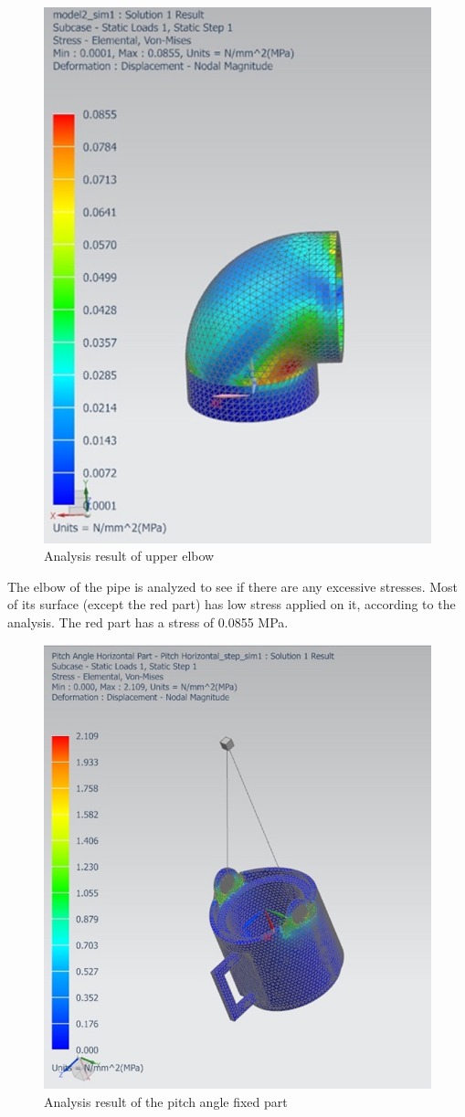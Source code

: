 \documentclass[12pt]{article}
\begin{document}
\begin{figure}[h!]
    \centering
    \includegraphics[width=0.5\linewidth]{elbowfinal.png}
    \caption{Analysis result of upper elbow}
    \label{fig:upperelbowfinal}
\end{figure}


The elbow of the pipe is analyzed to see if there are any excessive stresses. Most of its surface (except the red part) has low stress applied on it, according to the analysis. The red part has a stress of 0.0855 MPa.
\newpage

\begin{figure}[H]
    \centering
    \includegraphics[width=0.6\linewidth]{pitchanglefixedfinal.png}
    \caption{Analysis result of the pitch angle fixed part}
    \label{fig:pitchanglefixedfinal}
\end{figure}
\end{document}
